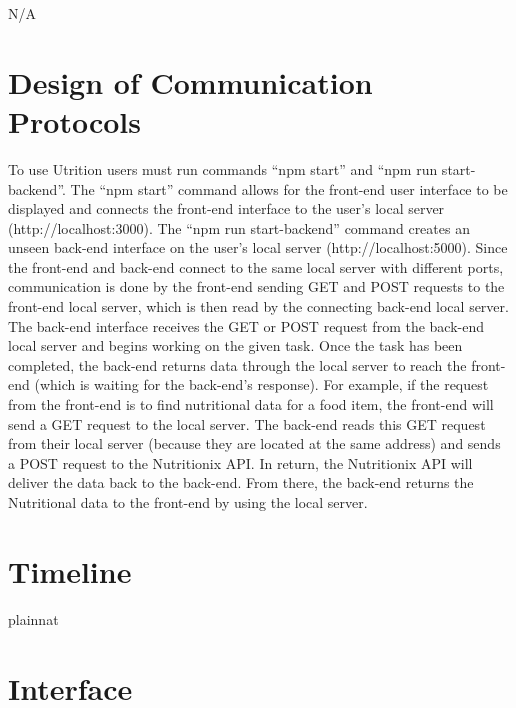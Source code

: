 \documentclass[12pt, titlepage]{article}
\begin{document}
N/A

\section{Design of Communication Protocols}


To use Utrition users must run commands “npm start” and “npm run start-backend”. The “npm start” command allows for the front-end user interface to be displayed and connects the front-end interface to the user’s local server (http://localhost:3000). The “npm run start-backend” command creates an unseen back-end interface on the user’s local server (http://localhost:5000). Since the front-end and back-end connect to the same local server with different ports, communication is done by the front-end sending GET and POST requests to the front-end local server, which is then read by the connecting back-end local server. The back-end interface receives the GET or POST request from the back-end local server and begins working on the given task. Once the task has been completed, the back-end returns data through the local server to reach the front-end (which is waiting for the back-end’s response). For example, if the request from the front-end is to find nutritional data for a food item, the front-end will send a GET request to the local server. The back-end reads this GET request from their local server (because they are located at the same address) and sends a POST request to the Nutritionix API. In return, the Nutritionix API will deliver the data back to the back-end. From there, the back-end returns the Nutritional data to the front-end by using the local server. 


\section{Timeline}


 {plainnat}


\newpage{}

\appendix

\section{Interface}

\end{document}

